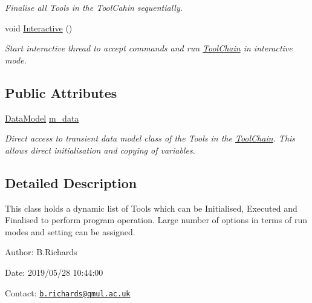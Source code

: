\begin{DoxyCompactItemize}
\begin{DoxyCompactList}\small\item\em Finalise all Tools in the Tool\-Cahin sequentially. \end{DoxyCompactList}\item 
\hypertarget{classToolChain_a9bb47b83b6b85c3b0fab75af0cda19bf}{void \hyperlink{classToolChain_a9bb47b83b6b85c3b0fab75af0cda19bf}{Interactive} ()}\label{classToolChain_a9bb47b83b6b85c3b0fab75af0cda19bf}

\begin{DoxyCompactList}\small\item\em Start interactive thread to accept commands and run \hyperlink{classToolChain}{Tool\-Chain} in interactive mode. \end{DoxyCompactList}\end{DoxyCompactItemize}
\subsection*{Public Attributes}
\begin{DoxyCompactItemize}
\item 
\hypertarget{classToolChain_a92c81316d0c0b16ee9e4a084dd976f83}{\hyperlink{classDataModel}{Data\-Model} \hyperlink{classToolChain_a92c81316d0c0b16ee9e4a084dd976f83}{m\-\_\-data}}\label{classToolChain_a92c81316d0c0b16ee9e4a084dd976f83}

\begin{DoxyCompactList}\small\item\em Direct access to transient data model class of the Tools in the \hyperlink{classToolChain}{Tool\-Chain}. This allows direct initialisation and copying of variables. \end{DoxyCompactList}\end{DoxyCompactItemize}


\subsection{Detailed Description}
This class holds a dynamic list of Tools which can be Initialised, Executed and Finalised to perform program operation. Large number of options in terms of run modes and setting can be assigned.

\begin{DoxyParagraph}{Author\-:}
B.\-Richards 
\end{DoxyParagraph}
\begin{DoxyParagraph}{Date\-:}
2019/05/28 10\-:44\-:00 
\end{DoxyParagraph}
Contact\-: \href{mailto:b.richards@qmul.ac.uk}{\tt b.\-richards@qmul.\-ac.\-uk} 

